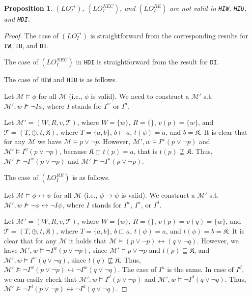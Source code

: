 \documentclass{article}
\newtheorem{prop}{Proposition}
\begin{document}
\begin{prop}

$(LO^{\rightarrow}_{I})$, $(LO^{NEC}_{I})$, and $(LO^{RE}_{I})$ are not valid in \texttt{HIW}, \texttt{HIU}, and \texttt{HDI}.

\end{prop}

\begin{proof}

The case of $(LO^{\rightarrow}_{I})$ is straightforward from the corresponding results for \texttt{IW}, \texttt{IU}, and \texttt{DI}.

The case of $(LO^{NEC}_{I})$ in \texttt{HDI} is straightforward from the result for \texttt{DI}. 

The case of \texttt{HIW} and \texttt{HIU} is as follows. 

Let $\mathcal{M} \models \phi$ for all $\mathcal{M}$ (i.e., $\phi$ is valid). We need to construct a $\mathcal{M}'$ s.t. $\mathcal{M}', w \not \models \neg I \phi$, where $I$ stands for $I^{w}$ or $I^{u}$.


Let $\mathcal{M}' = (W, R, v, \mathcal{T})$, where $W = \{w\}$, $R = \{\}$, $v(p) = \{w\}$, and $\mathcal{T} = (T, \oplus, t, \mathfrak{K})$, where $T =\{a, b\}$, $b \sqsubset a$, $t(\phi) = a$, and $b = \mathfrak{K}$. It is clear that for any $\mathcal{M}$ we have $\mathcal{M} \models p \vee \neg p$. However, $\mathcal{M}', w \models I^{w} (p \vee \neg p)$ and $\mathcal{M}' \models I^{u} (p \vee \neg p)$, because $\mathfrak{K} \sqsubset t(p) = a$, that is $t(p) \not \sqsubseteq \mathfrak{K}$. Thus, $\mathcal{M}' \not \models \neg I^{w} (p \vee \neg p)$ and $\mathcal{M}' \not \models \neg I^{u} (p \vee \neg p)$.




The case of $(LO^{RE}_{I})$  is as follows. 

Let $\mathcal{M} \models \phi \leftrightarrow \psi$ for all $\mathcal{M}$ (i.e., $\phi \rightarrow \psi$ is valid). We construct a $\mathcal{M}'$ s.t. $\mathcal{M}', w \not \models \neg \phi \leftrightarrow \neg I \psi$, where $I$ stands for $I^{w}$, $I^{u}$, or $I^{d}$.

Let $\mathcal{M}' = (W, R, v, \mathcal{T})$, where $W = \{w\}$, $R = \{\}$, $v(p) = v(q) = \{w\}$, and $\mathcal{T} = (T, \oplus, t, \mathfrak{K})$, where $T =\{a, b\}$, $b \sqsubset a$, $t(\psi) = a$, and $t(\phi) = b = \mathfrak{K}$. It is clear that for any $\mathcal{M}$ it holds that $\mathcal{M} \models (p \vee \neg p) \leftrightarrow (q \vee \neg q)$. However, we have $\mathcal{M}', w \models \neg I^{w} (p \vee \neg p)$, since $\mathcal{M}' \models p \vee \neg p$ and  $t(p) \sqsubseteq \mathfrak{K}$, and $\mathcal{M}', w \models I^{w} (q \vee \neg q)$, since  $t(q) \not \sqsubseteq \mathfrak{K}$. Thus, $\mathcal{M}' \not \models \neg I^{w} (p \vee \neg p) \leftrightarrow \neg I^{w} (q \vee \neg q)$. The case of $I^{u}$ is the same. In case of $I^{d}$, we can easily check that $\mathcal{M}', w \models I^{d} (p \vee \neg p)$ and $\mathcal{M}', w \models \neg I^{d} (q \vee \neg q)$. Thus, $\mathcal{M}' \not \models \neg I^{d} (p \vee \neg p) \leftrightarrow \neg I^{d} (q \vee \neg q)$.



\end{proof}
\end{document}
